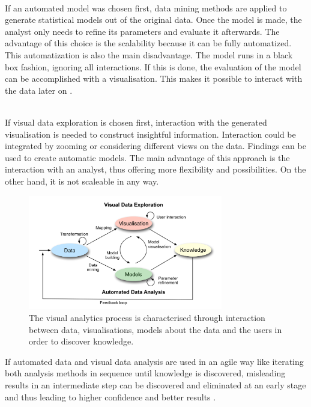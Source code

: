 \begin{enumerate}
 \hfill \\
If an automated model was chosen first, data mining methods are applied to generate statistical models out of the original data. Once the model is made, the analyst only needs to refine its parameters and evaluate it afterwards. The advantage of this choice is the scalability because it can be fully automatized. This automatization is also the main disadvantage. The model runs in a black box fashion, ignoring all interactions. If this is done, the evaluation of the model can be accomplished with a visualisation. This makes it possible to interact with the data later on .

 \hfill \\
If visual data exploration is chosen first, interaction with the generated visualisation is needed to construct insightful information. Interaction could be integrated by zooming or considering different views on the data. Findings can be used to create automatic models. The main advantage of this approach is the interaction with an analyst, thus offering more flexibility and possibilities. On the other hand, it is not scaleable in any way.
\end{enumerate}

\begin{figure}[!htb]
\centering
\includegraphics[height=5cm,keepaspectratio]{images/va/va-process.png}
\caption[
    The visual analytics process is characterised through interaction between data, visualisations, models about the data and the users in order to discover knowledge .
]{The visual analytics process is characterised through interaction between data, visualisations, models about the data and the users in order to discover knowledge.}
\label{fig:va-process}
\end{figure}

If automated data and visual data analysis are used in an agile way like iterating both analysis methods in sequence until knowledge is discovered, misleading results in an intermediate step can be discovered and eliminated at an early stage and thus leading to higher confidence and better results .

